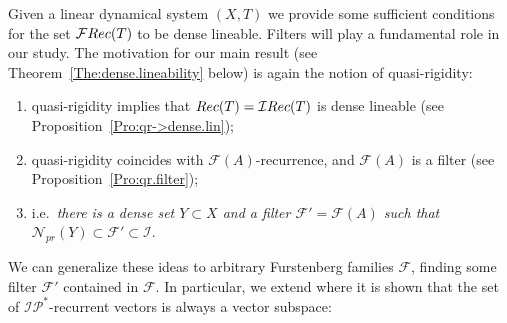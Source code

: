 \documentclass[openright,11pt]{article}
\theoremstyle{plain}
\theoremstyle{definition}
\newcommand{\Fc}{\mathcal{F}}
\newcommand{\Ic}{\mathcal{I}}
\newcommand{\IP}{\mathcal{IP}}
\newcommand{\Nc}{\mathcal{N}}
\newcommand{\Rec}{\textup{Rec}}
\begin{document}
Given a linear dynamical system $(X,T)$ we provide some sufficient conditions for the set $\Fc\Rec(T)$ to be dense lineable. Filters will play a fundamental role in our study. The motivation for our main result (see Theorem~\ref{The:dense.lineability} below) is again the notion of quasi-rigidity:
\begin{enumerate}[--]
	\item quasi-rigidity implies that $\Rec(T)=\Ic\Rec(T)$ is dense lineable (see Proposition~\ref{Pro:qr->dense.lin});
	
	\item quasi-rigidity coincides with $\Fc(A)$-recurrence, and $\Fc(A)$ is a filter (see Proposition~\ref{Pro:qr.filter});
	
	\item i.e.\ {\em there is a dense set $Y \subset X$ and a filter $\Fc'=\Fc(A)$ such that $\Nc_{pr}(Y) \subset \Fc' \subset \Ic$}.
\end{enumerate}
We can generalize these ideas to arbitrary Furstenberg families $\Fc$, finding some filter $\Fc'$ contained in $\Fc$. In particular, we extend \cite[Theorem 6.1]{BoGrLoPe2022} where it is shown that the set of $\IP^*$-recurrent vectors is always a vector subspace:
\end{document}

